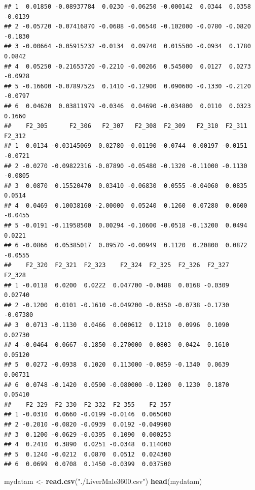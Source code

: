 \documentclass[]{article}
\newenvironment{Shaded}{\begin{snugshade}}{\end{snugshade}}
\newcommand{\KeywordTok}[1]{\textcolor[rgb]{0.13,0.29,0.53}{\textbf{#1}}}
\newcommand{\NormalTok}[1]{#1}
\newcommand{\StringTok}[1]{\textcolor[rgb]{0.31,0.60,0.02}{#1}}
\begin{document}
\begin{verbatim}
## 1  0.01850 -0.08937784  0.0230 -0.06250 -0.000142  0.0344  0.0358 -0.0139
## 2 -0.05720 -0.07416870 -0.0688 -0.06540 -0.102000 -0.0780 -0.0820 -0.1830
## 3 -0.00664 -0.05915232 -0.0134  0.09740  0.015500 -0.0934  0.1780  0.0842
## 4  0.05250 -0.21653720 -0.2210 -0.00266  0.545000  0.0127  0.0273 -0.0928
## 5 -0.16600 -0.07897525  0.1410 -0.12900  0.090600 -0.1330 -0.2120 -0.0797
## 6  0.04620  0.03811979 -0.0346  0.04690 -0.034800  0.0110  0.0323  0.1660
##    F2_305      F2_306   F2_307   F2_308  F2_309   F2_310  F2_311  F2_312
## 1  0.0134 -0.03145069  0.02780 -0.01190 -0.0744  0.00197 -0.0151 -0.0721
## 2 -0.0270 -0.09822316 -0.07890 -0.05480 -0.1320 -0.11000 -0.1130 -0.0805
## 3  0.0870  0.15520470  0.03410 -0.06830  0.0555 -0.04060  0.0835  0.0514
## 4  0.0469  0.10038160 -2.00000  0.05240  0.1260  0.07280  0.0600 -0.0455
## 5 -0.0191 -0.11958500  0.00294 -0.10600 -0.0518 -0.13200  0.0494  0.0221
## 6 -0.0866  0.05385017  0.09570 -0.00949  0.1120  0.20800  0.0872 -0.0555
##    F2_320  F2_321  F2_323    F2_324  F2_325  F2_326  F2_327   F2_328
## 1 -0.0118  0.0200  0.0222  0.047700 -0.0488  0.0168 -0.0309  0.02740
## 2 -0.1200  0.0101 -0.1610 -0.049200 -0.0350 -0.0738 -0.1730 -0.07380
## 3  0.0713 -0.1130  0.0466  0.000612  0.1210  0.0996  0.1090  0.02730
## 4 -0.0464  0.0667 -0.1850 -0.270000  0.0803  0.0424  0.1610  0.05120
## 5  0.0272 -0.0938  0.1020  0.113000 -0.0859 -0.1340  0.0639  0.00731
## 6  0.0748 -0.1420  0.0590 -0.080000 -0.1200  0.1230  0.1870  0.05410
##    F2_329  F2_330  F2_332  F2_355    F2_357
## 1 -0.0310  0.0660 -0.0199 -0.0146  0.065000
## 2 -0.2010 -0.0820 -0.0939  0.0192 -0.049900
## 3  0.1200 -0.0629 -0.0395  0.1090  0.000253
## 4  0.2410  0.3890  0.0251 -0.0348  0.114000
## 5  0.1240 -0.0212  0.0870  0.0512  0.024300
## 6  0.0699  0.0708  0.1450 -0.0399  0.037500
\end{verbatim}

\begin{Shaded}
\begin{Highlighting}[]
\NormalTok{mydatam <-}\StringTok{ }\KeywordTok{read.csv}\NormalTok{(}\StringTok{"./LiverMale3600.csv"}\NormalTok{)}
\KeywordTok{head}\NormalTok{(mydatam)}
\end{Highlighting}
\end{Shaded}
\end{document}

